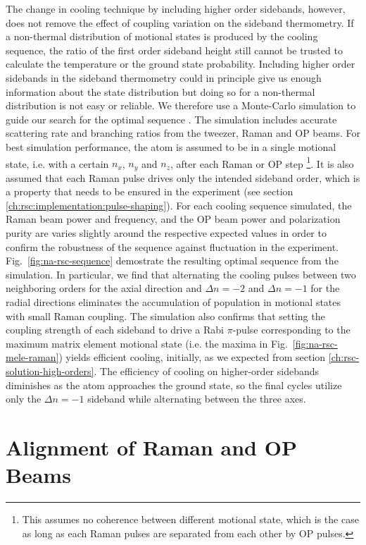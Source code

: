 The change in cooling technique by including higher order sidebands, however,
does not remove the effect of coupling variation on the sideband thermometry.
If a non-thermal distribution of motional states is produced by the cooling sequence,
the ratio of the first order sideband height still cannot be trusted to calculate
the temperature or the ground state probability.
Including higher order sidebands in the sideband thermometry could in principle
give us enough information about the state distribution but doing
so for a non-thermal distribution is not easy or reliable.
We therefore use a Monte-Carlo simulation to guide our search
for the optimal sequence \cite{dalibard_wave-function_1992}.
The simulation includes accurate scattering rate and branching ratios
from the tweezer, Raman and OP beams.
For best simulation performance, the atom is assumed to be in a single motional state,
i.e. with a certain $n_x$, $n_y$ and $n_z$, after each Raman or OP step
\footnote{This assumes no coherence between different motional state,
  which is the case as long as each Raman pulses are separated from each other by OP pulses.}.
It is also assumed that each Raman pulse drives only the intended sideband order,
which is a property that needs to be ensured in the experiment
(see section \ref{ch:rsc:implementation:pulse-shaping}).
For each cooling sequence simulated,
the Raman beam power and frequency, and the OP beam power and polarization purity
are varies slightly around the respective expected values
in order to confirm the robustness of the sequence against fluctuation in the experiment.
Fig.~\ref{fig:na-rsc-sequence} demostrate the resulting optimal sequence from the simulation.
In particular, we find that alternating the cooling pulses between two
neighboring orders for the axial direction and $\Delta n=-2$ and $\Delta n=-1$
for the radial directions
eliminates the accumulation of population in motional states with small Raman coupling.
The simulation also confirms that setting the coupling strength of each sideband
to drive a Rabi $\pi$-pulse corresponding to the maximum matrix element motional state
(i.e. the maxima in Fig.~\ref{fig:na-rsc-mele-raman}) yields efficient cooling, initially,
as we expected from section \ref{ch:rsc-solution-high-orders}.
The efficiency of cooling on higher-order sidebands diminishes
as the atom approaches the ground state, so the final cycles utilize only
the $\Delta n=-1$ sideband while alternating between the three axes.

\section{Alignment of Raman and OP Beams}
\label{ch:rsc:alignment}

